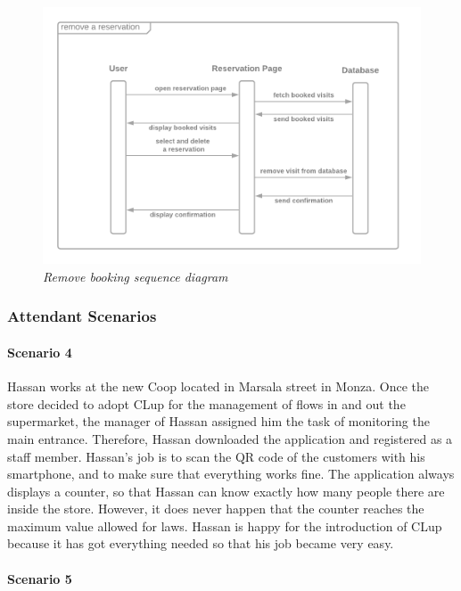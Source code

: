 \documentclass[table, 12pt]{article}
\begin{document}
\newpage
\begin{figure}[H]
    \centering
    \includegraphics[scale=0.38]{assets/remove-a-booking.png}
    \caption{\textit{Remove booking sequence diagram}}
\end{figure}



\subsubsection{Attendant Scenarios}
\paragraph{Scenario 4}

Hassan works at the new Coop located in Marsala street in Monza. Once the store decided to adopt CLup for the management of flows in and out the supermarket, the manager of Hassan assigned him the task of monitoring the main entrance. Therefore, Hassan downloaded the application and registered as a staff member. Hassan's job is to scan the QR code of the customers with his smartphone, and to make sure that everything works fine. The application always displays a counter, so that Hassan can know exactly how many people there are inside the store. However, it does never happen that the counter reaches the maximum value allowed for laws. Hassan is happy for the introduction of CLup because it has got everything needed so that his job became very easy.

\paragraph{Scenario 5}
\end{document}
